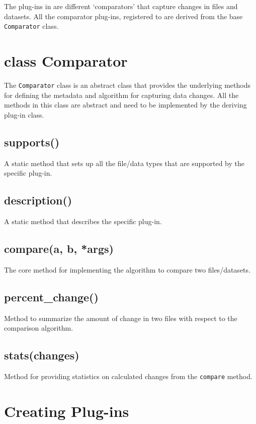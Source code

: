 The plug-ins in \systemname are different `comparators' that capture
changes in files and datasets. All the comparator plug-ins, registered
to \systemname are derived from the base \texttt{Comparator} class.

\section{class Comparator}
The \texttt{Comparator} class is an abstract class that provides
the underlying methods for defining the metadata and algorithm for
capturing data changes. All the methods in this class are abstract
and need to be implemented by the deriving plug-in class.

\subsection{supports()}

A static method that sets up all the file/data types that are
supported by the specific plug-in.

\subsection{description()}

A static method that describes the specific plug-in.

\subsection{compare(a, b, *args)}

The core method for implementing the algorithm to compare two
files/datasets.

\subsection{percent\_change()}

Method to summarize the amount of change in two files with respect
to the comparison algorithm.

\subsection{stats(changes)}

Method for providing statistics on calculated changes from the 
\texttt{compare} method.

\section{Creating Plug-ins}

